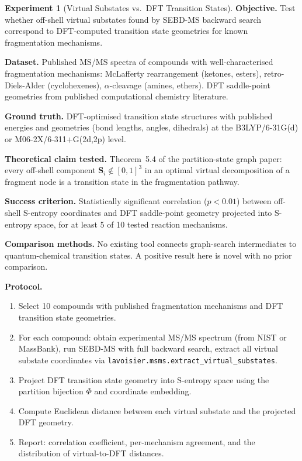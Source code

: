 \documentclass[11pt,a4paper]{article}
\theoremstyle{planstyle}
\theoremstyle{definition}
\newtheorem{experiment}[theorem]{Experiment}
\theoremstyle{remark}
\newcommand{\Sv}{\mathbf{S}}
\newcommand{\shk}[1]{\texttt{#1}}
\begin{document}
\begin{experiment}[Virtual Substates vs.\ DFT Transition States]
\label{exp:ts}
\textbf{Objective.} Test whether off-shell virtual substates found by
SEBD-MS backward search correspond to DFT-computed transition state
geometries for known fragmentation mechanisms.

\textbf{Dataset.} Published MS/MS spectra of compounds with
well-characterised fragmentation mechanisms: McLafferty rearrangement
(ketones, esters), retro-Diels-Alder (cyclohexenes), $\alpha$-cleavage
(amines, ethers). DFT saddle-point geometries from published
computational chemistry literature.

\textbf{Ground truth.} DFT-optimised transition state structures with
published energies and geometries (bond lengths, angles, dihedrals) at
the B3LYP/6-31G(d) or M06-2X/6-311+G(2d,2p) level.

\textbf{Theoretical claim tested.} Theorem~5.4 of the partition-state
graph paper: every off-shell component $\Sv_i \notin [0,1]^3$ in an
optimal virtual decomposition of a fragment node is a transition state
in the fragmentation pathway.

\textbf{Success criterion.} Statistically significant correlation
($p < 0.01$) between off-shell S-entropy coordinates and DFT
saddle-point geometry projected into S-entropy space, for at least
5 of 10 tested reaction mechanisms.

\textbf{Comparison methods.} No existing tool connects graph-search
intermediates to quantum-chemical transition states. A positive result
here is novel with no prior comparison.

\textbf{Protocol.}
\begin{enumerate}[nosep]
\item Select 10 compounds with published fragmentation mechanisms and
  DFT transition state geometries.
\item For each compound: obtain experimental MS/MS spectrum (from NIST
  or MassBank), run SEBD-MS with full backward search, extract all
  virtual substate coordinates via
  \shk{lavoisier.msms.extract\_virtual\_substates}.
\item Project DFT transition state geometry into S-entropy space using
  the partition bijection $\varPhi$ and coordinate embedding.
\item Compute Euclidean distance between each virtual substate and the
  projected DFT geometry.
\item Report: correlation coefficient, per-mechanism agreement, and
  the distribution of virtual-to-DFT distances.
\end{enumerate}
\end{experiment}
\end{document}
